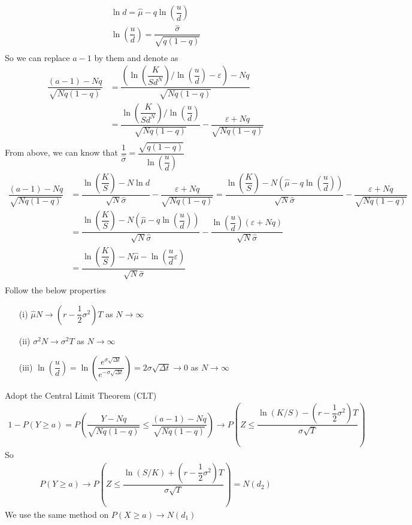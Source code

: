 \documentclass[12pt]{article}
\begin{document}
\begin{align*}
    \ln d = \hat{\mu} - q\ln(\dfrac{u}{d})\\
    \ln(\dfrac{u}{d}) = \dfrac{\hat{\sigma}}{\sqrt{q(1-q)}}\\
\end{align*}
So we can replace $a-1$ by them and denote as
\begin{align*}
    \dfrac{(a-1)-Nq}{\sqrt{Nq(1-q)}} & = \dfrac{(\ln(\dfrac{K}{Sd^N})/\ln(\dfrac{u}{d})-\varepsilon)-Nq}{\sqrt{Nq(1-q)}}\\
    & = \dfrac{\ln(\dfrac{K}{Sd^N})/\ln(\dfrac{u}{d})}{\sqrt{Nq(1-q)}} - \dfrac{\varepsilon+Nq}{\sqrt{Nq(1-q)}}\\
\end{align*}
From above, we can know that $\dfrac{1}{\hat{\sigma}} = \dfrac{\sqrt{q(1-q)}}{\ln(\dfrac{u}{d})}$
\begin{align*}
    \dfrac{(a-1)-Nq}{\sqrt{Nq(1-q)}} & = \dfrac{\ln(\dfrac{K}{S})-N\ln d}{\sqrt{N}\hat{\sigma}} - \dfrac{\varepsilon+Nq}{\sqrt{Nq(1-q)}} = \dfrac{\ln(\dfrac{K}{S})-N(\hat{\mu} - q\ln(\dfrac{u}{d}))}{\sqrt{N}\hat{\sigma}} - \dfrac{\varepsilon+Nq}{\sqrt{Nq(1-q)}}\\
    & = \dfrac{\ln(\dfrac{K}{S})-N(\hat{\mu} - q\ln(\dfrac{u}{d}))}{\sqrt{N}\hat{\sigma}} - \dfrac{\ln(\dfrac{u}{d})(\varepsilon+Nq)}{\sqrt{N}\hat\sigma}\\
    & = \dfrac{\ln(\dfrac{K}{S})-N\hat{\mu}-\ln(\dfrac{u}{d}\varepsilon)}{\sqrt{N}\hat{\sigma}}\\
\end{align*}
Follow the below properties
\begin{enumerate}
    \item[(i)] $\hat{\mu}N \to (r-\dfrac{1}{2}\sigma^2)T$ as $N\to\infty$
    \item[(ii)] $\hat{\sigma^2}N\to\sigma^2 T$ as $N\to\infty$
    \item[(iii)] $\ln(\dfrac{u}{d}) = \ln(\dfrac{e^{\sigma\sqrt{\Delta t}}}{e^{-\sigma\sqrt{\Delta t}}}) = 2\sigma\sqrt{\Delta t}\to 0$ as $N\to\infty$\\   
\end{enumerate}
Adopt the Central Limit Theorem (CLT)
\begin{align*}
    1-P(Y\ge a) = P(\dfrac{Y-Nq}{\sqrt{Nq(1-q)}}\leq \dfrac{(a-1)-Nq}{\sqrt{Nq(1-q)}}) \to P(Z \leq \dfrac{\ln(K/S) - (r-\dfrac{1}{2}\sigma^2)T}{\sigma\sqrt{T}})
\end{align*}
So
\begin{align*}
    P(Y\ge a) \to P(Z \leq \dfrac{\ln(S/K) + (r-\dfrac{1}{2}\sigma^2)T}{\sigma\sqrt{T}}) = N(d_2)
\end{align*}
We use the same method on $P(X\ge a) \to N(d_1)$
\end{document}
